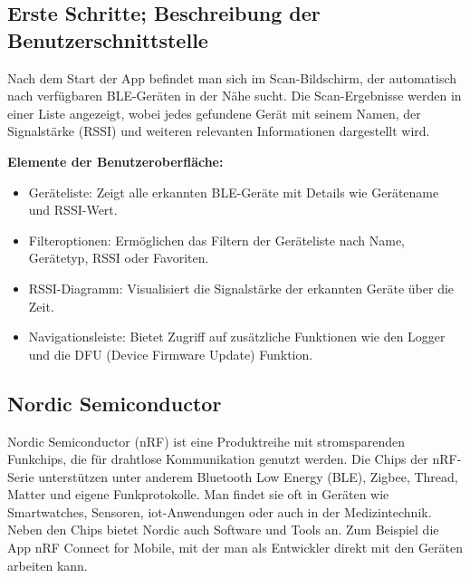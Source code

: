 \subsection{Erste Schritte; Beschreibung der Benutzerschnittstelle}
Nach dem Start der App befindet man sich im Scan-Bildschirm, der automatisch nach verfügbaren BLE-Geräten in der Nähe sucht. Die Scan-Ergebnisse werden in einer Liste angezeigt, wobei jedes gefundene Gerät mit seinem Namen, der Signalstärke (RSSI) und weiteren relevanten Informationen dargestellt wird.
\cite{Philips:Mobile:Android}
\cite{Nordic:2018:Apple}

\vspace{1\baselineskip}

\textbf{Elemente der Benutzeroberfläche:}
\begin{itemize}
    \item Geräteliste: Zeigt alle erkannten BLE-Geräte mit Details wie Gerätename und RSSI-Wert.
    
    \item Filteroptionen: Ermöglichen das Filtern der Geräteliste nach Name, Gerätetyp, RSSI oder Favoriten.
    
    \item RSSI-Diagramm: Visualisiert die Signalstärke der erkannten Geräte über die Zeit.
    
    \item Navigationsleiste: Bietet Zugriff auf zusätzliche Funktionen wie den Logger und die DFU (Device Firmware Update) Funktion.
\end{itemize}



\subsection{Nordic Semiconductor}
Nordic Semiconductor (nRF) ist eine Produktreihe mit stromsparenden Funkchips, die für drahtlose Kommunikation genutzt werden. Die Chips der nRF-Serie unterstützen unter anderem Bluetooth Low Energy (BLE), Zigbee, Thread, Matter und eigene Funkprotokolle. Man findet sie oft in Geräten wie Smartwatches, Sensoren, \ac{iot}-Anwendungen oder auch in der Medizintechnik. Neben den Chips bietet Nordic auch Software und Tools an. Zum Beispiel die App nRF Connect for Mobile, mit der man als Entwickler direkt mit den Geräten arbeiten kann. \cite{Nordic:2025}

